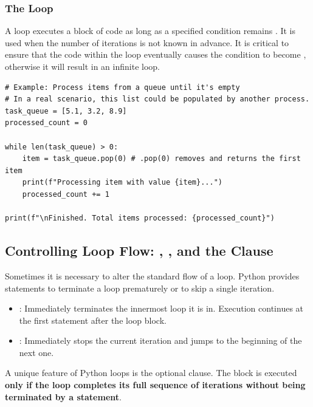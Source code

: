 \subsubsection*{The  Loop}
A  loop executes a block of code as long as a specified condition remains . It is used when the number of iterations is not known in advance. It is critical to ensure that the code within the loop eventually causes the condition to become , otherwise it will result in an infinite loop.

\text{ }\begin{verbatim}
# Example: Process items from a queue until it's empty
# In a real scenario, this list could be populated by another process.
task_queue = [5.1, 3.2, 8.9]
processed_count = 0

while len(task_queue) > 0:
    item = task_queue.pop(0) # .pop(0) removes and returns the first item
    print(f"Processing item with value {item}...")
    processed_count += 1

print(f"\nFinished. Total items processed: {processed_count}")
\end{verbatim}

\subsection{Controlling Loop Flow: , , and the  Clause}
\label{subsec:loop_control}
Sometimes it is necessary to alter the standard flow of a loop. Python provides statements to terminate a loop prematurely or to skip a single iteration.

\begin{itemize}
    \item {}: Immediately terminates the innermost loop it is in. Execution continues at the first statement after the loop block.
    \item {}: Immediately stops the current iteration and jumps to the beginning of the next one.
\end{itemize}

A unique feature of Python loops is the optional  clause. The  block is executed \textbf{only if the loop completes its full sequence of iterations without being terminated by a  statement}.

